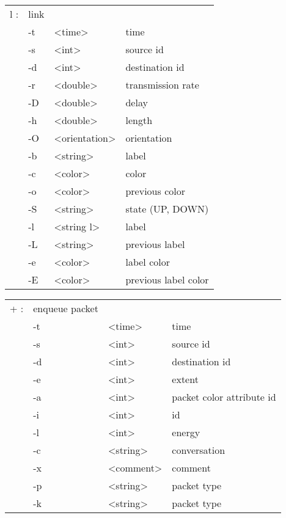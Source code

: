   \begin{tabular}{llll}
  l : & link & & \\
    &  -t & <time> & time \\
    &  -s & <int> & source id \\
    &  -d & <int> & destination id \\
    &  -r & <double> & transmission rate \\
    &  -D & <double> & delay \\
    &  -h & <double> & length \\
    &  -O & <orientation> & orientation \\
    &  -b & <string> & label \\
    &  -c & <color> & color \\
    &  -o & <color> & previous color \\
    &  -S & <string> & state (UP, DOWN) \\
    &  -l & <string l> & label \\
    &  -L & <string> & previous label \\
    &  -e & <color> & label color \\
    &  -E & <color> & previous label color \\
  \end{tabular}

  \begin{tabular}{llll}
  + : & enqueue packet & & \\
    &  -t & <time> & time \\
    &  -s & <int> & source id \\
    &  -d & <int> & destination id \\
    &  -e & <int> & extent \\
    &  -a & <int> & packet color attribute id \\
    &  -i & <int> & id \\
    &  -l & <int> & energy \\
    &  -c & <string> & conversation \\
    &  -x & <comment> & comment \\
    &  -p & <string> & packet type \\
    &  -k & <string> & packet type \\
  \end{tabular}

